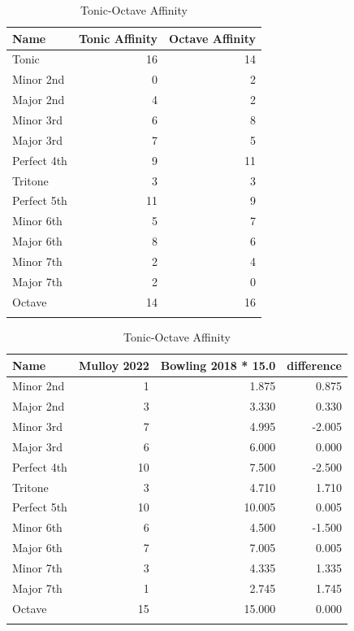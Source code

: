 \documentclass[sn-mathphys]{sn-jnl}%
\begin{document}
\begin{table}[h]
\begin{center}
\begin{minipage}{174pt}
\caption{Tonic-Octave Affinity}\label{tab1}%
\begin{tabular}{@{}lrr@{}}
\toprule
Name & Tonic Affinity & Octave Affinity\\
\midrule
Tonic & 16 & 14 \\
Minor 2nd & 0 & 2 \\
Major 2nd & 4 & 2 \\
Minor 3rd & 6 & 8 \\
Major 3rd & 7 & 5 \\
Perfect 4th & 9 & 11 \\
Tritone & 3 & 3 \\
Perfect 5th & 11 & 9 \\
Minor 6th & 5 & 7 \\
Major 6th & 8 & 6 \\
Minor 7th & 2 & 4 \\
Major 7th & 2 & 0 \\
Octave & 14 & 16 \\
\botrule
\end{tabular}
\end{minipage}
\end{center}
\end{table}

\begin{table}[h]
\begin{center}
\begin{minipage}{174pt}
\caption{Tonic-Octave Affinity}\label{tab1}%
\begin{tabular}{@{}lrrr@{}}
\toprule
Name & Mulloy 2022 & Bowling 2018 * 15.0 & difference \\
  \midrule
Minor 2nd & 1 & 1.875 & 0.875\\
Major 2nd & 3 & 3.330 & 0.330 \\
Minor 3rd & 7 & 4.995 & -2.005 \\
Major 3rd & 6 & 6.000 & 0.000 \\
Perfect 4th & 10 & 7.500 & -2.500\\
Tritone & 3 & 4.710 & 1.710 \\
Perfect 5th & 10 & 10.005 & 0.005 \\
Minor 6th & 6 & 4.500 & -1.500\\
Major 6th & 7 & 7.005 & 0.005\\
Minor 7th & 3 & 4.335 & 1.335 \\
Major 7th & 1 & 2.745 & 1.745\\
Octave & 15 & 15.000 & 0.000 \\
\botrule
\end{tabular}
\end{minipage}
\end{center}
\end{table}
\end{document}
